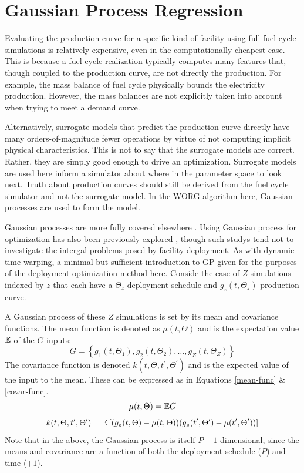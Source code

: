 \section{Gaussian Process Regression}
\label{gp}

Evaluating the production curve for a specific kind of facility using 
full fuel cycle simulations is relatively expensive, even in the 
computationally cheapest case. This is because a fuel cycle realization 
typically computes many features that, though coupled to the production 
curve, are not directly the production. For example, the mass balance of 
fuel cycle physically bounds the electricity production. However, the 
mass balances are not explicitly taken into account when trying to meet
a demand curve.

Alternatively, surrogate models that predict the production curve directly
have many orders-of-magnitude fewer operations by virtue of not computing
implicit physical characteristics. This is not to say that the surrogate 
models are correct.  Rather, they are simply good enough to drive an 
optimization. Surrogate models are used here inform a simulator about where
in the parameter space to look next. Truth about production curves should
still be derived from the fuel cycle simulator and not the surrogate model.
In the WORG algorithm here, Gaussian processes are used to form the model. 

Gaussian processes are more fully covered elsewhere 
\cite{rasmussen2006gaussian}. Using Gaussian process for optimization has 
also been previously explored \citeme, though such studys tend not to 
investigate the intergal problems posed by facility deployment. As with 
dynamic time warping, a minimal but sufficient introduction to GP given for 
the purposes of the deployment optimization method here.
Conside the case of $Z$ simulations indexed by $z$ that each have a 
$\Theta_z$ deployment schedule and $g_z(t, \Theta_z)$ production curve.

A Gaussian process of these $Z$ simulations is set by its mean and 
covariance functions. The mean function is denoted as $\mu(t, \Theta)$ and 
is the expectation value $\mathbb{E}$ of 
the $G$ inputs:
\begin{equation}
\label{G}
G = \left\{g_1(t, \Theta_1), g_2(t, \Theta_2), \ldots, 
           g_Z(t, \Theta_Z)\right\}
\end{equation}
The covariance function is denoted $k(t, \Theta, t^\prime, \Theta^\prime)$ 
and is the expected value of the input to the mean. These can be expressed as
in Equations \ref{mean-func} \& \ref{covar-func}.
\begin{equation}
\label{mean-func}
\mu(t, \Theta) = \mathbb{E} G
\end{equation}
\begin{equation}
\label{covar-func}
k(t, \Theta, t^\prime, \Theta^\prime) = 
    \mathbb{E}\left[(g_z(t, \Theta) - \mu(t, \Theta))
            (g_z(t^\prime, \Theta^\prime) - \mu(t^\prime, \Theta^\prime))
      \right]
\end{equation}
Note that in the above, the Gaussian process is itself $P+1$ dimensional, 
since the means and covariance are a function of both the deployment 
schedule ($P$) and time ($+1$).


